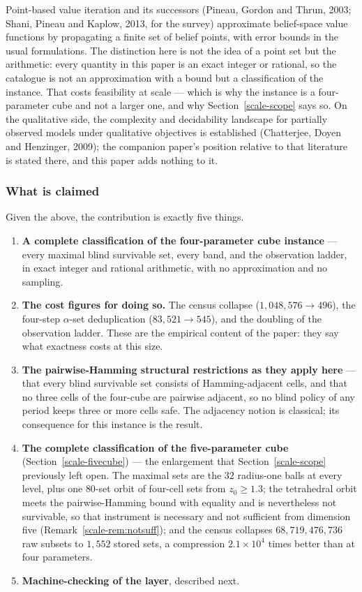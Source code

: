 \documentclass[10pt,twocolumn]{article}
\theoremstyle{plain}
\theoremstyle{definition}
\theoremstyle{remark}
\begin{document}
Point-based value iteration and its successors (Pineau, Gordon and Thrun, 2003; Shani,
Pineau and Kaplow, 2013, for the survey) approximate belief-space value functions by
propagating a finite set of belief points, with error bounds in the usual formulations. The
distinction here is not the idea of a point set but the arithmetic: every quantity in this
paper is an exact integer or rational, so the catalogue is not an approximation with a
bound but a classification of the instance. That costs feasibility at scale --- which is why
the instance is a four-parameter cube and not a larger one, and why
Section~\ref{scale-scope} says so. On the qualitative side, the complexity and decidability
landscape for partially observed models under qualitative objectives is established
(Chatterjee, Doyen and Henzinger, 2009); the companion paper's position relative to that
literature is stated there, and this paper adds nothing to it.

\subsubsection{What is claimed}

Given the above, the contribution is exactly five things.

\begin{enumerate}
\item \textbf{A complete classification of the four-parameter cube instance} --- every
  maximal blind survivable set, every band, and the observation ladder, in exact integer
  and rational arithmetic, with no approximation and no sampling.
\item \textbf{The cost figures for doing so.} The census collapse
  (\(1{,}048{,}576 \to 496\)), the four-step \(\alpha\)-set deduplication
  (\(83{,}521 \to 545\)), and the doubling of the observation ladder. These are the
  empirical content of the paper: they say what exactness costs at this size.
\item \textbf{The pairwise-Hamming structural restrictions as they apply here} --- that
  every blind survivable set consists of Hamming-adjacent cells, and that no three cells of
  the four-cube are pairwise adjacent, so no blind policy of any period keeps three or more
  cells safe. The adjacency notion is classical; its consequence for this instance is the
  result.
\item \textbf{The complete classification of the five-parameter cube}
  (Section~\ref{scale-fivecube}) --- the enlargement that Section~\ref{scale-scope} previously left open. The
  maximal sets are the \(32\) radius-one balls at every level, plus one \(80\)-set orbit of
  four-cell sets from \(z_{0} \ge 1.3\); the tetrahedral orbit meets the pairwise-Hamming bound
  with equality and is nevertheless not survivable, so that instrument is necessary and not
  sufficient from dimension five (Remark~\ref{scale-rem:notsuff}); and the census collapses
  \(68{,}719{,}476{,}736\) raw subsets to \(1{,}552\) stored sets, a compression
  \(2.1 \times 10^{4}\) times better than at four parameters.
\item \textbf{Machine-checking of the layer}, described next.
\end{enumerate}
\end{document}
